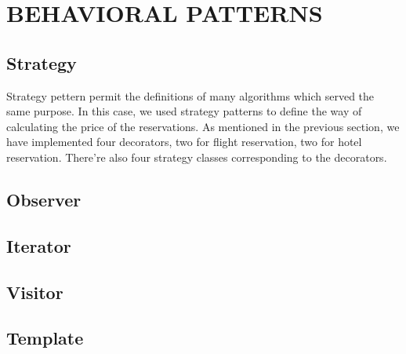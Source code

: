 \section{BEHAVIORAL PATTERNS}
\subsection{Strategy}
Strategy pettern permit the definitions of many algorithms which served the same purpose. In this case, we used strategy patterns to define the way of calculating the price of the reservations. As mentioned in the previous section, we have implemented four decorators, two for flight reservation, two for hotel reservation. There're also four strategy classes corresponding to the decorators.



\subsection{Observer}

\subsection{Iterator}

\subsection{Visitor}

\subsection{Template}